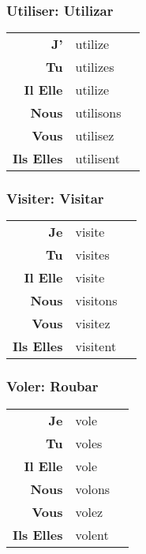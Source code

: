 \documentclass{subfiles}
\begin{document}
\begin{multicols*}{3}
        \subsubsection{Utiliser: Utilizar}
            \begin{tabular}{r l r}
                \textbf{J'}        & utilize   &\\
                \textbf{Tu}        & utilizes  &\\
                \textbf{Il Elle}   & utilize   &\\
                \textbf{Nous}      & utilisons &\\
                \textbf{Vous}      & utilisez  &\\
                \textbf{Ils Elles} & utilisent &
            \end{tabular}

        \subsubsection{Visiter: Visitar}
            \begin{tabular}{r l r}
                \textbf{Je}        & visite   &\\
                \textbf{Tu}        & visites  &\\
                \textbf{Il Elle}   & visite   &\\
                \textbf{Nous}      & visitons &\\
                \textbf{Vous}      & visitez  &\\
                \textbf{Ils Elles} & visitent &\\
            \end{tabular}
    
        \subsubsection{Voler: Roubar}
            \begin{tabular}{r l r}
                \textbf{Je}        & vole   &\\
                \textbf{Tu}        & voles  &\\
                \textbf{Il Elle}   & vole   &\\
                \textbf{Nous}      & volons &\\
                \textbf{Vous}      & volez  &\\
                \textbf{Ils Elles} & volent &
            \end{tabular}


\end{multicols*}
\end{document}
